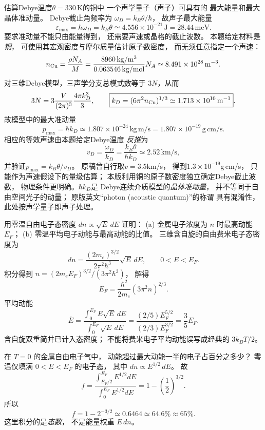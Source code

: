 估算Debye温度$\theta=330\,\mathrm K$的铜中
一个声学量子（声子）可具有的
最大能量和最大晶体准动量。
\exsolution
Debye截止角频率为
$\omega_D=k_B\theta/\hbar$，
故声子最大能量
\[
 \boxed{\varepsilon_{\max}=\hbar\omega_D=k_B\theta
 \simeq4.556\times10^{-21}\,\mathrm J
 =28.44\,\mathrm{meV}}.
\]
要求准动量不能只由能量得到，
还需要声速或晶格的截止波数。
本题给定材料是\emph{铜}，
可使用其宏观密度与摩尔质量估计原子数密度，
而无须任意指定一个声速：
\[
 n_{\rm Cu}=\frac{\rho N_A}{M}
 =\frac{8960\,\mathrm{kg/m^3}}
 {0.063546\,\mathrm{kg/mol}}N_A
 \simeq8.491\times10^{28}\,\mathrm{m^{-3}}.
\]
对三维Debye模型，三声学分支总模式数等于
$3N$，从而
\[
 3N=3\frac{V}{(2\pi)^3}\frac{4\pi k_D^3}{3},
 \qquad
 \boxed{k_D=(6\pi^2 n_{\rm Cu})^{1/3}
 \simeq1.713\times10^{10}\,\mathrm{m^{-1}}}.
\]
故模型中的最大准动量
\[
 \boxed{p_{\max}=\hbar k_D
 \simeq1.807\times10^{-24}\,\mathrm{kg\,m/s}
 =1.807\times10^{-19}\,\mathrm{g\,cm/s}}.
\]
相应的等效声速由本题给定Debye温度
\emph{反推}为
\[
 v_D=\frac{\omega_D}{k_D}
 =\frac{k_B\theta}{\hbar k_D}
 \simeq2.52\,\mathrm{km/s},
\]
并验证$p_{\max}=k_B\theta/v_D$。
\excheck 原稿曾自行取$v=3.5$km/s，
得到$1.3\times10^{-19}$g\,cm/s，
只能作为声速假设下的量级估算；
本版利用铜的原子数密度独立确定Debye截止波数，
物理条件更明确。$\hbar k_D$是
Debye连续介质模型的\emph{晶体准动量}，
并不等同于自由空间光子的动量；
原版英文“photon (acoustic quantum)”的称谓
具有混淆性，此处按声学量子即声子处理。


用零温自由电子态密度
$dn\propto\sqrt E\,dE$ 证明：
(a) 金属电子浓度为 $n$ 时最高动能 $E_F$；
(b) 零温平均电子动能与最高动能的比值。
\exsolution
三维含自旋的自由费米电子态密度为
\[
 dn=\frac{(2m_e)^{3/2}}{2\pi^2\hbar^3}
 \sqrt E\,dE,\qquad 0<E<E_F.
\]
积分得到
$n=(2m_eE_F)^{3/2}/(3\pi^2\hbar^3)$，
解得
\[
 \boxed{E_F=\frac{\hbar^2}{2m_e}(3\pi^2n)^{2/3}}.
\]
平均动能
\[
 \overline E=\frac{\int_0^{E_F}E\sqrt E\,dE}
 {\int_0^{E_F}\sqrt E\,dE}
 =\frac{(2/5)E_F^{5/2}}{(2/3)E_F^{3/2}}
 =\boxed{\frac35E_F}.
\]
\excheck 含自旋双重简并已计入态密度；
不能将费米电子平均动能误写成经典的 $3k_BT/2$。

在 $T=0$ 的金属自由电子气中，
动能超过最大动能一半的电子占百分之多少？
\exsolution
零温仅填满 $0<E<E_F$ 的电子态，
其中 $dn\propto E^{1/2}\,dE$。
故
\[
 f=\frac{\int_{E_F/2}^{E_F}E^{1/2}dE}
 {\int_0^{E_F}E^{1/2}dE}
 =1-\left(\frac12\right)^{3/2}.
\]
所以
\[
 \boxed{f=1-2^{-3/2}\simeq0.6464
 \simeq64.6\%\approx65\%}.
\]
\excheck 这里积分的是\emph{态数}，
不是能量权重 $E\,dn$。


